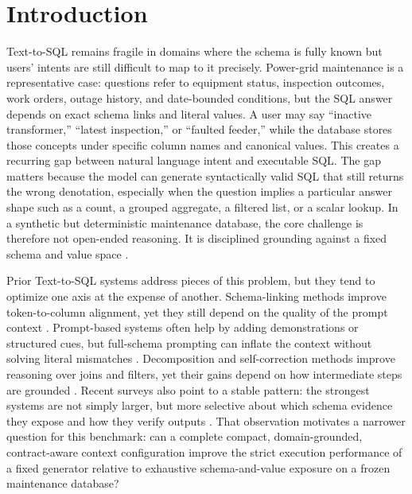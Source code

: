 \documentclass[cmc,article,submit,moreauthors,pdftex]{Definitions/tsp}
\begin{document}
\section{Introduction}\label{introduction}

Text-to-SQL remains fragile in domains where the schema is fully known but users' intents are still difficult to map to it precisely. Power-grid maintenance is a representative case: questions refer to equipment status, inspection outcomes, work orders, outage history, and date-bounded conditions, but the SQL answer depends on exact schema links and literal values. A user may say ``inactive transformer,'' ``latest inspection,'' or ``faulted feeder,'' while the database stores those concepts under specific column names and canonical values. This creates a recurring gap between natural language intent and executable SQL. The gap matters because the model can generate syntactically valid SQL that still returns the wrong denotation, especially when the question implies a particular answer shape such as a count, a grouped aggregate, a filtered list, or a scalar lookup. In a synthetic but deterministic maintenance database, the core challenge is therefore not open-ended reasoning. It is disciplined grounding against a fixed schema and value space \cite{zhong2020semantic,lei2020reexamining,liu2022semantic,quamar2022natural}.

Prior Text-to-SQL systems address pieces of this problem, but they tend to optimize one axis at the expense of another. Schema-linking methods improve token-to-column alignment, yet they still depend on the quality of the prompt context \cite{lei2020reexamining,gan2021robustness,liu2021awakening}. Prompt-based systems often help by adding demonstrations or structured cues, but full-schema prompting can inflate the context without solving literal mismatches \cite{chang2023prompt,nan2023enhancing,sun2023sqlprompt}. Decomposition and self-correction methods improve reasoning over joins and filters, yet their gains depend on how intermediate steps are grounded \cite{pourreza2023dinsql,wang2023macsql,talaei2024chess}. Recent surveys also point to a stable pattern: the strongest systems are not simply larger, but more selective about which schema evidence they expose and how they verify outputs \cite{liu2024survey,katsogiannismeimarakis2023survey,huang2024survey}. That observation motivates a narrower question for this benchmark: can a complete compact, domain-grounded, contract-aware context configuration improve the strict execution performance of a fixed generator relative to exhaustive schema-and-value exposure on a frozen maintenance database?
\end{document}
